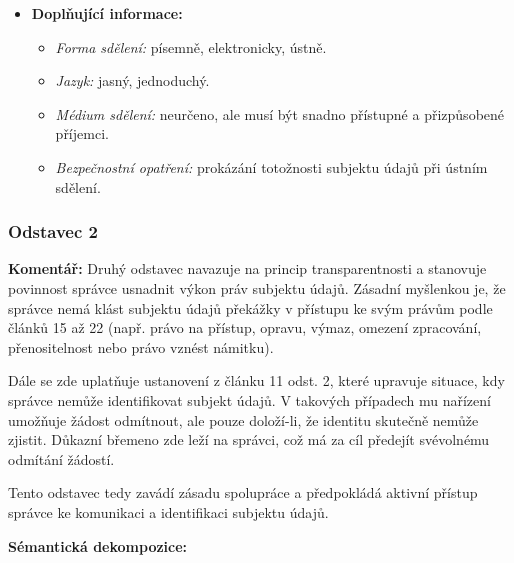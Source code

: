 \begin{itemize}
\item \textbf{Doplňující informace:}
  \begin{itemize}
    \item \textit{Forma sdělení:} písemně, elektronicky, ústně.
    \item \textit{Jazyk:} jasný, jednoduchý.
    \item \textit{Médium sdělení:} neurčeno, ale musí být snadno přístupné a přizpůsobené příjemci.
    \item \textit{Bezpečnostní opatření:} prokázání totožnosti subjektu údajů při ústním sdělení.
  \end{itemize}
\end{itemize}


\subsubsection{Odstavec 2}
\label{sec:odstavec-2}
\begin{displayquote}  \cite{clanek12}
\end{displayquote}

\noindent \textbf{Komentář:}
Druhý odstavec navazuje na princip transparentnosti a stanovuje povinnost správce usnadnit výkon práv subjektu údajů. Zásadní myšlenkou je, že správce nemá klást subjektu údajů překážky v přístupu ke svým právům podle článků 15 až 22 (např. právo na přístup, opravu, výmaz, omezení zpracování, přenositelnost nebo právo vznést námitku).

Dále se zde uplatňuje ustanovení z článku 11 odst. 2, které upravuje situace, kdy správce nemůže identifikovat subjekt údajů. V takových případech mu nařízení umožňuje žádost odmítnout, ale pouze doloží-li, že identitu skutečně nemůže zjistit. Důkazní břemeno zde leží na správci, což má za cíl předejít svévolnému odmítání žádostí.

Tento odstavec tedy zavádí zásadu spolupráce a předpokládá aktivní přístup správce ke komunikaci a identifikaci subjektu údajů.

\vspace{1em}

\noindent \textbf{Sémantická dekompozice:}

